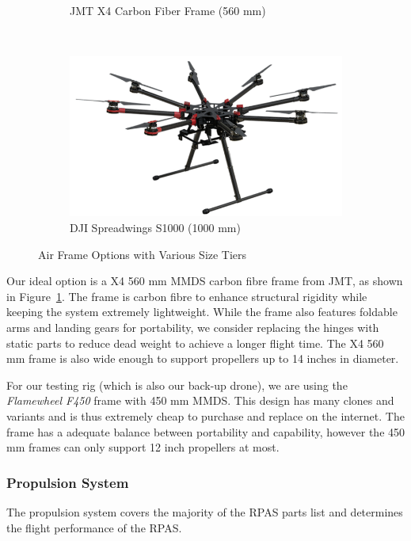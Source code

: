\begin{figure}[h]
\begin{subfigure}[b]{0.33\textwidth}
        \caption{JMT X4 Carbon Fiber Frame (560 mm)}
        \label{fig:jmtx4}
    \end{subfigure}
    ~
    \begin{subfigure}[b]{0.33\textwidth}
        \centering
        \includegraphics[width=\textwidth]{img/djis1000}
        \caption{DJI Spreadwings S1000 (1000 mm)}
        \label{fig:djis1000}
    \end{subfigure}
    
    \caption{Air Frame Options with Various Size Tiers }
\end{figure}

Our ideal option is a X4 560 mm MMDS carbon fibre frame from JMT, as shown in Figure~\ref{fig:jmtx4}. The frame is carbon fibre to enhance structural rigidity while keeping the system extremely lightweight. While the frame also features foldable arms and landing gears for portability, we consider replacing the hinges with static parts to reduce dead weight to achieve a longer flight time. The X4 560 mm frame is also wide enough to support propellers up to 14 inches in diameter. 

For our testing rig (which is also our back-up drone), we are using the \textit{Flamewheel F450} frame with 450 mm MMDS. This design has many clones and variants and is thus extremely cheap to purchase and replace on the internet. The frame has a adequate balance between portability and capability, however the 450 mm frames can only support 12 inch propellers at most.

\subsubsection{Propulsion System}\label{section:propsys}

The propulsion system covers the majority of the RPAS parts list and determines the flight performance of the RPAS. 

